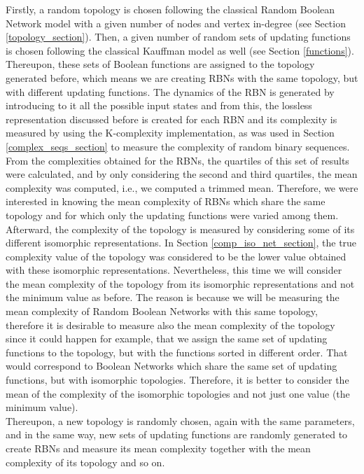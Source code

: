 Firstly, a random topology is chosen following the classical Random Boolean Network model with a given number of nodes and vertex in-degree (see Section \ref{topology_section}). Then, a given number of random sets of updating functions is chosen following the classical Kauffman model as well (see Section \ref{functions}). Thereupon, these sets of Boolean functions are assigned to the topology generated before, which means we are creating RBNs with the same topology, but with different updating functions. The dynamics of the RBN is generated by introducing to it all the possible input states and from this, the lossless representation discussed before is created for each RBN and its complexity is measured by using the K-complexity implementation, as was used in Section \ref{complex_seqs_section} to measure the complexity of random binary sequences. From the complexities obtained for the RBNs, the quartiles of this set of results were calculated, and by only considering the second and third quartiles, the mean complexity was computed, i.e., we computed a trimmed mean. Therefore, we were interested in knowing the mean complexity of RBNs which share the same topology and for which only the updating functions were varied among them.\\

Afterward, the complexity of the topology is measured by considering some of its different isomorphic representations. In Section \ref{comp_iso_net_section}, the true complexity value of the topology was considered to be the lower value obtained with these isomorphic representations. Nevertheless, this time we will consider the mean complexity of the topology from its isomorphic representations and not the minimum value as before. The reason is because we will be measuring the mean complexity of Random Boolean Networks with this same topology, therefore it is desirable to measure also the mean complexity of the topology since it could happen for example, that we assign the same set of updating functions to the topology, but with the functions sorted in different order. That would correspond to Boolean Networks which share the same set of updating functions, but with isomorphic topologies. Therefore, it is better to consider the mean of the complexity of the isomorphic topologies and not just one value (the minimum value).\\

Thereupon, a new topology is randomly chosen, again with the same parameters, and in the same way, new sets of updating functions are randomly generated to create RBNs and measure its mean complexity together with the mean complexity of its topology and so on.\\

